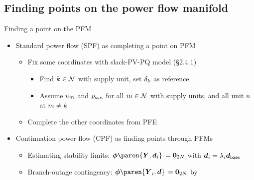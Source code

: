 \subsection{Finding points on the power flow manifold}

\begin{frame}[t]{Finding a point on the PFM}{}
    \begin{itemize}
        \item <1-> \textcolor<1>{CornellRed}{Standard power flow} (SPF)
            as completing a point on PFM
        \begin{itemize}
            \item \textcolor<1>{CornellRed}{Fix some coordinates} with slack-PV-PQ model (\S2.4.1)
            \begin{itemize}
                \item Find \(k\in\mathcal{N}\) with supply unit, set \(\delta_{k}\) as reference
                \item Assume \(\upsilon_{m}\) and \(p_{\mathsf{u,}n}\) for
                    all \(m\in\mathcal{N}\) with supply units,
                    and all unit \(n\) at \(m \neq k\)
            \end{itemize}

            \item \textcolor<1>{CornellRed}{Complete the other coordinates} from PFE
        \end{itemize}

        \vspace{0.5em}
        \item <2-> \textcolor<2-3>{CornellRed}{Continuation power flow} (CPF)
            as finding points through PFMs
        \begin{itemize}
            \item \textcolor<2>{CornellRed}{Estimating stability limits}:
                \(\Resids\paren{\Ybus,\DemDrws_{i}} \, = \ZerosVec[2\NumBuses]\)
                with \(\boldsymbol{d}_{i} = \lambda_{i}\boldsymbol{d}_{\mathsf{base}}\)
                \cite{AjjarapuChristy1992,CanizaresAlvarado1993,Chiang+1995,GomezQuiles+2016,%
                Liu+2005,Avalos+2009}

            \item \textcolor<2>{CornellRed}{Branch-outage contingency}:
                \(\Resids\paren{\Ybus_{i},\DemDrws} \, = \ZerosVec[2\NumBuses]\)
                by
                \cite{FlueckDondeti2000,FlueckQiu2004,Matarucco+2004,MataruccoNetoAmancio2014}
        \end{itemize}


\end{itemize}
\end{frame}
